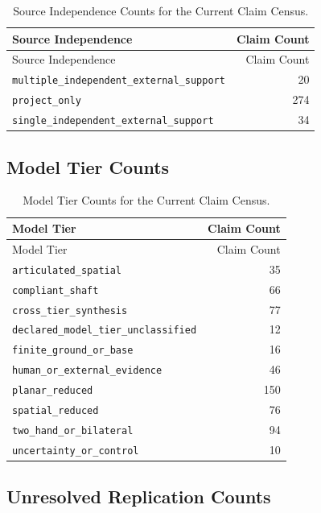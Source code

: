 \documentclass[
  letterpaper,
]{report}
\begin{document}
\begin{longtable}[]{@{}lr@{}}
\caption{Source Independence Counts for the Current Claim
Census.}\label{tbl-claim-source-independence}\tabularnewline
\toprule\noalign{}
Source Independence & Claim Count \\
\midrule\noalign{}
\endfirsthead
\toprule\noalign{}
Source Independence & Claim Count \\
\midrule\noalign{}
\endhead
\bottomrule\noalign{}
\endlastfoot
\texttt{multiple\_independent\_external\_support} & 20 \\
\texttt{project\_only} & 274 \\
\texttt{single\_independent\_external\_support} & 34 \\
\end{longtable}

\subsection{Model Tier Counts}\label{model-tier-counts}

\begin{longtable}[]{@{}lr@{}}
\caption{Model Tier Counts for the Current Claim
Census.}\label{tbl-claim-model-tiers}\tabularnewline
\toprule\noalign{}
Model Tier & Claim Count \\
\midrule\noalign{}
\endfirsthead
\toprule\noalign{}
Model Tier & Claim Count \\
\midrule\noalign{}
\endhead
\bottomrule\noalign{}
\endlastfoot
\texttt{articulated\_spatial} & 35 \\
\texttt{compliant\_shaft} & 66 \\
\texttt{cross\_tier\_synthesis} & 77 \\
\texttt{declared\_model\_tier\_unclassified} & 12 \\
\texttt{finite\_ground\_or\_base} & 16 \\
\texttt{human\_or\_external\_evidence} & 46 \\
\texttt{planar\_reduced} & 150 \\
\texttt{spatial\_reduced} & 76 \\
\texttt{two\_hand\_or\_bilateral} & 94 \\
\texttt{uncertainty\_or\_control} & 10 \\
\end{longtable}

\subsection{Unresolved Replication
Counts}\label{unresolved-replication-counts}
\end{document}
